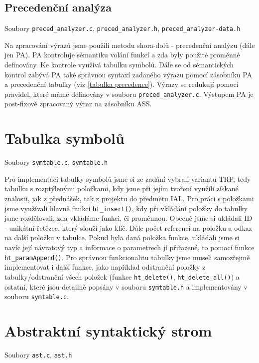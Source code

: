 \documentclass[a4paper, 12pt]{article}
\begin{document}
    \subsection{Precedenční analýza}
    Soubory \texttt{preced\_analyzer.c}, \texttt{preced\_analyzer.h}, \texttt{preced\_analyzer-data.h}

    Na zpracování výrazů jsme použili metodu shora-dolů - precedenční analýzu (dále jen PA). PA kontroluje sémantiku volání funkcí a zda byly použité proměnné definovány. Ke kontrole využívá tabulku symbolů. Dále se od sémantických kontrol zabývá PA také správnou syntaxí zadaného výrazu pomocí zásobníku PA a precedenční tabulky (viz \ref{tabulka precedence}). Výrazy se redukují pomocí pravidel, které máme definovány v souboru \texttt{preced\_analyzer.c}. Výstupem PA je post-fixově zpracovaný výraz na zásobníku ASS.

    \section{Tabulka symbolů}
    Soubory \texttt{symtable.c}, \texttt{symtable.h}

    Pro implementaci tabulky symbolů jsme si ze zadání vybrali variantu TRP, tedy tabulku s rozptýlenými položkami, kdy jsme při jejím tvoření využili získané znalosti, jak z přednášek, tak z projektu do předmětu IAL. Pro práci s položkami jsme využívali hlavně funkci \texttt{ht\_insert()}, kdy při vkládání položky do tabulky jsme rozdělovali, zda vkládáme funkci, či proměnnou. Obecně jsme si ukládali ID - unikátní řetězec, který slouží jako klíč. Dále počet referencí na položku a odkaz na další položku v tabulce. Pokud byla daná položka funkce, ukládali jsme si navíc její návratový typ a informace o parametrech jí přiřazené, to pomocí funkce \texttt{ht\_paramAppend()}.
    Pro správnou funkcionalitu tabulky jsme museli samozřejmě implementovat i další funkce, jako například odstranění položky z tabulky/odstranění všech položek (funkce \texttt{ht\_delete()}, \texttt{ht\_delete\_all()}) a ostatní, které jsou detailně popsány v souboru
    \texttt{symtable.h} a implementovány v souboru \texttt{symtable.c}.

    \section{Abstraktní syntaktický strom}
    Soubory \texttt{ast.c}, \texttt{ast.h}
\end{document}
